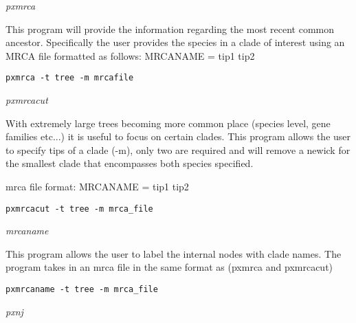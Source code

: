 \documentclass[12pt,letterpaper]{article}
\renewcommand{\subsection}[1]{%
\bigskip
\begin{center}
\begin{large}
\normalfont\itshape #1
\end{large}
\end{center}}
\begin{document}
\subsection{pxmrca}

This program will provide the information regarding the most recent common ancestor. Specifically the user provides the species in a clade of interest using an MRCA file formatted as follows:
MRCANAME = tip1 tip2

\begin{flushleft}
\begin{verbatim}
pxmrca -t tree -m mrcafile
\end{verbatim}
\end{flushleft}


\subsection{pxmrcacut}

With extremely large trees becoming more common place (species level, gene families etc...) it is useful to focus on certain clades. This program allows the user to specify tips of a clade (-m), only two are required and will remove a newick for the smallest clade that encompasses both species specified.

mrca file format:
MRCANAME = tip1 tip2

\begin{flushleft}
\begin{verbatim}
pxmrcacut -t tree -m mrca_file
\end{verbatim}
\end{flushleft}

\subsection{mrcaname}

This program allows the user to label the internal nodes with clade names. The program takes in an mrca file in the same format as (pxmrca and pxmrcacut)

\begin{flushleft}
\begin{verbatim}
pxmrcaname -t tree -m mrca_file
\end{verbatim}
\end{flushleft}

\subsection{pxnj}
\end{document}
